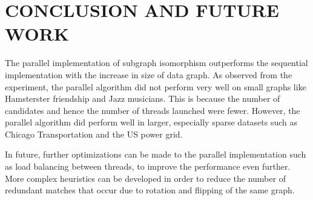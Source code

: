 \chapter{CONCLUSION AND FUTURE WORK}
\label{chap:concl}

The parallel implementation of subgraph isomorphism outperforms the sequential implementation with the increase in size of data graph. As observed from the experiment, the parallel algorithm did not perform very well on small graphs like Hamsterster friendship and Jazz musicians. This is because the number of candidates and hence the number of threads launched were fewer. However, the parallel algorithm did perform well in larger, especially sparse datasets such as Chicago Transportation and the US power grid.

In future, further optimizations can be made to the parallel implementation such as load balancing between threads, to improve the performance even further. More complex heuristics can be developed in order to reduce the number of redundant matches that occur due to rotation and flipping of the same graph.
